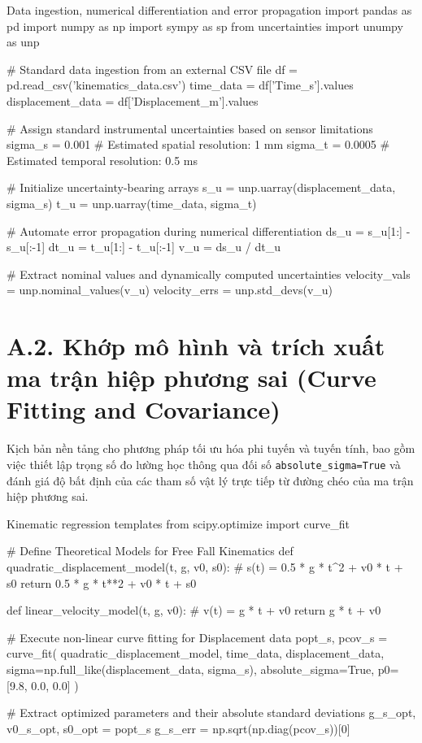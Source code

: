 \begin{pycode}{Data ingestion, numerical differentiation and error propagation}
import pandas as pd
import numpy as np
import sympy as sp
from uncertainties import unumpy as unp

# Standard data ingestion from an external CSV file
df = pd.read_csv('kinematics_data.csv')
time_data = df['Time_s'].values
displacement_data = df['Displacement_m'].values

# Assign standard instrumental uncertainties based on sensor limitations
sigma_s = 0.001   # Estimated spatial resolution: 1 mm
sigma_t = 0.0005  # Estimated temporal resolution: 0.5 ms

# Initialize uncertainty-bearing arrays
s_u = unp.uarray(displacement_data, sigma_s)
t_u = unp.uarray(time_data, sigma_t)

# Automate error propagation during numerical differentiation
ds_u = s_u[1:] - s_u[:-1]
dt_u = t_u[1:] - t_u[:-1]
v_u = ds_u / dt_u

# Extract nominal values and dynamically computed uncertainties
velocity_vals = unp.nominal_values(v_u)
velocity_errs = unp.std_devs(v_u)
\end{pycode}

\section*{A.2. Khớp mô hình và trích xuất ma trận hiệp phương sai (Curve Fitting and Covariance)}

Kịch bản nền tảng cho phương pháp tối ưu hóa phi tuyến và tuyến tính, bao gồm việc thiết lập trọng số đo lường học thông qua đối số \texttt{absolute\_sigma=True} và đánh giá độ bất định của các tham số vật lý trực tiếp từ đường chéo của ma trận hiệp phương sai.

\begin{pycode}{Kinematic regression templates}
from scipy.optimize import curve_fit

# Define Theoretical Models for Free Fall Kinematics
def quadratic_displacement_model(t, g, v0, s0):
    # s(t) = 0.5 * g * t^2 + v0 * t + s0
    return 0.5 * g * t**2 + v0 * t + s0

def linear_velocity_model(t, g, v0):
    # v(t) = g * t + v0
    return g * t + v0

# Execute non-linear curve fitting for Displacement data
popt_s, pcov_s = curve_fit(
    quadratic_displacement_model,
    time_data,
    displacement_data,
    sigma=np.full_like(displacement_data, sigma_s),
    absolute_sigma=True,
    p0=[9.8, 0.0, 0.0]
)

# Extract optimized parameters and their absolute standard deviations
g_s_opt, v0_s_opt, s0_opt = popt_s
g_s_err = np.sqrt(np.diag(pcov_s))[0]
\end{pycode}

